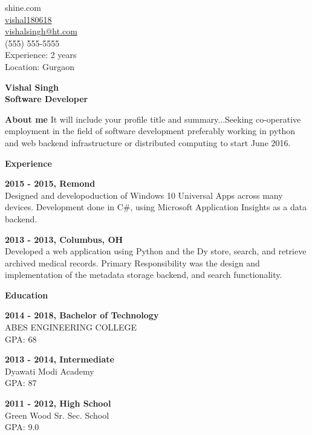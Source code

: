 \documentclass[a4paper,12pt,final]{memoir}
\newcommand{\Sep}{\vspace{1.5em}}
\newcommand{\SmallSep}{\vspace{0.5em}}
\newenvironment{AboutMe}
	{\ignorespaces\textbf{\color{RoyalBlue} About me}}
	{\Sep\ignorespacesafterend}
\newcommand{\CVSection}[1]
	{\Large\textbf{ #1}\par
	\SmallSep\normalsize\normalfont}
\newcommand{\CVItem}[1]
	{\textbf{\color{RoyalBlue} #1}}
\begin{document}
\begin{flushright}\small
	shine.com\\
	\url{ vishal180618 } \\
	\url{ vishalsingh@ht.com } \\
	(555) 555-5555\\
	Experience: 2 years\\
	Location: Gurgaon\\
\end{flushright}\normalsize
\framebreak


\Huge\bfseries {\color{RoyalBlue} Vishal Singh} \\
\Large\bfseries  Software Developer \\

\normalsize\normalfont

\begin{AboutMe}
It will include your profile title and summary...Seeking co-operative employment in the field of software development preferably working in python and web backend infrastructure or distributed computing to start June 2016.
\end{AboutMe}

\CVSection{Experience}

    \CVItem{ 2015 - 2015, Remond }\\
    Designed and developoduction of Windows 10 Universal Apps across many devices. Development done in C#, using Microsoft Application Insights as a data backend.
    \SmallSep

    \CVItem{ 2013 - 2013, Columbus, OH }\\
    Developed a web application using Python and the Dy store, search, and retrieve archived medical records. Primary Responsibility was the design and implementation of the metadata storage backend, and search functionality.
    \SmallSep


\CVSection{Education}


    \CVItem{ 2014 - 2018, Bachelor of Technology }\\
    ABES ENGINEERING COLLEGE\\
	GPA: 68
    \SmallSep


    \CVItem{ 2013 - 2014, Intermediate }\\
    Dyawati Modi Academy\\
	GPA: 87
    \SmallSep


    \CVItem{ 2011 - 2012, High School }\\
    Green Wood Sr. Sec. School\\
	GPA: 9.0
    \SmallSep
\end{document}
